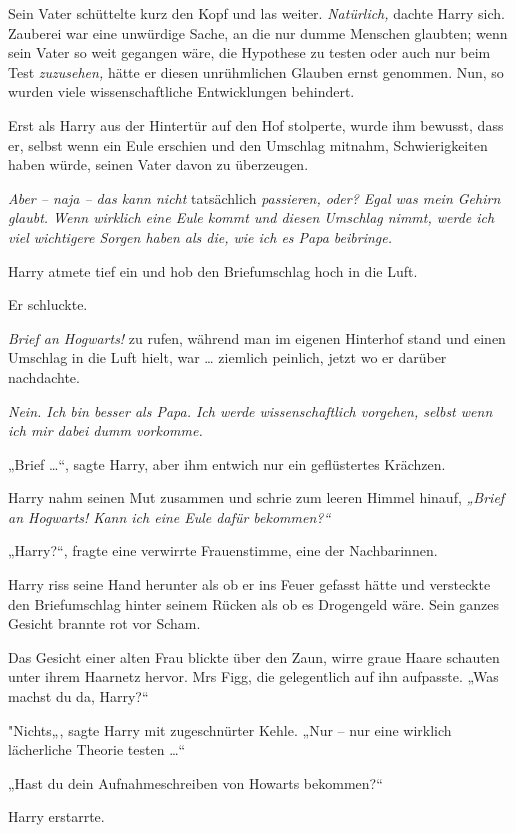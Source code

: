 {Sein Vater schüttelte kurz den Kopf und las weiter. \emph{Natürlich,} dachte Harry sich. Zauberei war eine unwürdige Sache, an die nur dumme Menschen glaubten; wenn sein Vater so weit gegangen wäre, die Hypothese zu testen oder auch nur beim Test \emph{zuzusehen,} hätte er diesen unrühmlichen Glauben ernst genommen. Nun, so wurden viele wissenschaftliche Entwicklungen behindert.

Erst als Harry aus der Hintertür auf den Hof stolperte, wurde ihm bewusst, dass er, selbst wenn ein Eule erschien und den Umschlag mitnahm, Schwierigkeiten haben würde, seinen Vater davon zu überzeugen.

\emph{Aber -- naja -- das kann nicht} tatsächlich \emph{passieren, oder? Egal was mein Gehirn glaubt. Wenn wirklich eine Eule kommt und diesen Umschlag nimmt, werde ich viel wichtigere Sorgen haben als die, wie ich es Papa beibringe.}

Harry atmete tief ein und hob den Briefumschlag hoch in die Luft.

Er schluckte.

\emph{Brief an Hogwarts!} zu rufen, während man im eigenen Hinterhof stand und einen Umschlag in die Luft hielt, war … ziemlich peinlich, jetzt wo er darüber nachdachte.

\emph{Nein. Ich bin besser als Papa. Ich werde wissenschaftlich vorgehen, selbst wenn ich mir dabei dumm vorkomme.}

„Brief …“, sagte Harry, aber ihm entwich nur ein geflüstertes Krächzen.

Harry nahm seinen Mut zusammen und schrie zum leeren Himmel hinauf, \emph{„Brief an Hogwarts! Kann ich eine Eule dafür bekommen?“}

„Harry?“, fragte eine verwirrte Frauenstimme, eine der Nachbarinnen.

Harry riss seine Hand herunter als ob er ins Feuer gefasst hätte und versteckte den Briefumschlag hinter seinem Rücken als ob es Drogengeld wäre. Sein ganzes Gesicht brannte rot vor Scham.

Das Gesicht einer alten Frau blickte über den Zaun, wirre graue Haare schauten unter ihrem Haarnetz hervor. Mrs Figg, die gelegentlich auf ihn aufpasste. „Was machst du da, Harry?“

"Nichts„, sagte Harry mit zugeschnürter Kehle. „Nur -- nur eine wirklich lächerliche Theorie testen …“

„Hast du dein Aufnahmeschreiben von Howarts bekommen?“

Harry erstarrte.

}

